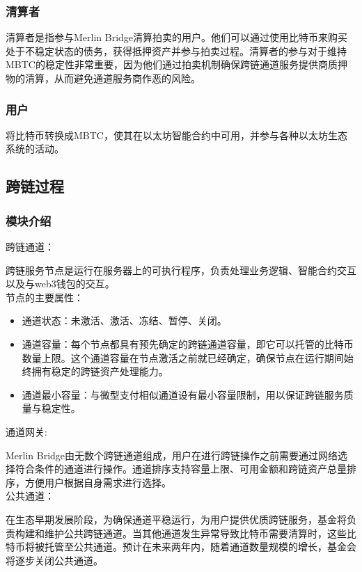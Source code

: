 \documentclass{article}
\begin{document}
\subsubsection{清算者}
\par 清算者是指参与Merlin Bridge清算拍卖的用户。他们可以通过使用比特币来购买处于不稳定状态的债务，获得抵押资产并参与拍卖过程。清算者的参与对于维持MBTC的稳定性非常重要，因为他们通过拍卖机制确保跨链通道服务提供商质押物的清算，从而避免通道服务商作恶的风险。
\subsubsection{用户}
将比特币转换成MBTC，使其在以太坊智能合约中可用，并参与各种以太坊生态系统的活动。
\subsection{跨链过程}
\subsubsection{模块介绍}
跨链通道：
\par 跨链服务节点是运行在服务器上的可执行程序，负责处理业务逻辑、智能合约交互以及与web3钱包的交互。\\
节点的主要属性：
\begin{itemize}
    \item 通道状态：未激活、激活、冻结、暂停、关闭。
    \item 通道容量：每个节点都具有预先确定的跨链通道容量，即它可以托管的比特币数量上限。这个通道容量在节点激活之前就已经确定，确保节点在运行期间始终拥有稳定的跨链资产处理能力。
    \item 通道最小容量：与微型支付相似通道设有最小容量限制，用以保证跨链服务质量与稳定性。
\end{itemize}
通道网关:
\par Merlin Bridge由无数个跨链通道组成，用户在进行跨链操作之前需要通过网络选择符合条件的通道进行操作。通道排序支持容量上限、可用金额和跨链资产总量排序，方便用户根据自身需求进行选择。\\
公共通道：
\par 在生态早期发展阶段，为确保通道平稳运行，为用户提供优质跨链服务，基金将负责构建和维护公共跨链通道。当其他通道发生异常导致比特币需要清算时，这些比特币将被托管至公共通道。预计在未来两年内，随着通道数量规模的增长，基金会将逐步关闭公共通道。
\end{document}
